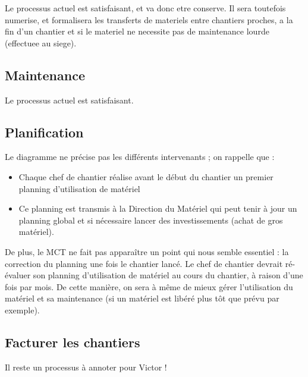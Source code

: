 \documentclass[a4paper]{article}
\begin{document}

Le processus actuel est satisfaisant, et va donc etre conserve. Il sera
toutefois numerise, et formalisera les transferts de materiels entre
chantiers proches, a la fin d'un chantier et si le materiel ne necessite
pas de maintenance lourde (effectuee au siege).


\subsection{Maintenance}

Le processus actuel est satisfaisant.

\subsection{Planification}

Le diagramme ne précise pas les différents intervenants ; on rappelle que :
\begin{itemize}
\item Chaque chef de chantier réalise avant le début du chantier un premier
planning d'utilisation de matériel
\item Ce planning est transmis à la Direction du Matériel qui peut tenir à
jour un planning global et si nécessaire lancer des investissements (achat
de gros matériel).
\end{itemize}

\vskip 6pt

De plus, le MCT ne fait pas apparaître un point qui nous semble essentiel :
la correction du planning une fois le chantier lancé. Le chef de chantier
devrait ré-évaluer son planning d'utilisation de matériel au cours du
chantier, à raison d'une fois par mois. De cette manière, on sera à même de
mieux gérer l'utilisation du matériel et sa maintenance (si un matériel est
libéré plus tôt que prévu par exemple).


\subsection{Facturer les chantiers}


Il reste un processus à annoter pour Victor !
\end{document}
